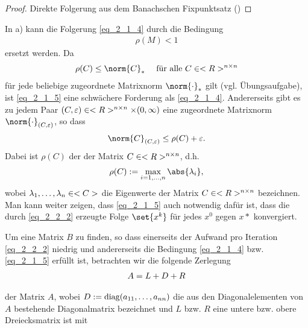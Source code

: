 \begin{proof}
	Direkte Folgerung aus dem Banachschen Fixpunktsatz ()
\end{proof}


\begin{remark}
	In a) kann die Folgerung \eqref{eq_2_1_4} durch die Bedingung
	\begin{align}
	\rho(M) < 1\label{eq_2_1_5}
	\end{align}
	ersetzt werden. Da
	\begin{align}
		\rho(C) \le \norm{C}_{\ast} \quad \text{ für alle } C \in \Rnn \notag
	\end{align}
	für jede beliebige zugeordnete Matrixnorm $\norm{\cdot}_{\ast}$ gilt (vgl. Übungsaufgabe), ist \eqref{eq_2_1_5} eine schwächere Forderung als \eqref{eq_2_1_4}. Andererseits gibt es zu jedem Paar $(C,\varepsilon) \in <R>^{n \times n} \times (0,\infty)$ eine zugeordnete Matrixnorm $\norm{\cdot}_{(C,\epsilon)}$, so dass
	\begin{align}
		\norm{C}_{(C,\epsilon)} \le \rho(C) + \epsilon. \notag
	\end{align}
	Dabei ist $\rho(C)$ der  der Matrix $C \in <R>^{n \times n}$, d.h.
	\begin{align}
		\rho(C) := \max_{i = 1,\dots,n}\abs{\lambda_i}, \notag
	\end{align}
	wobei $\lambda_1,\dots,\lambda_n \in <C>$ die Eigenwerte der Matrix $C \in <R>^{n \times n}$ bezeichnen. Man kann weiter zeigen, dass \eqref{eq_2_1_5} auch notwendig dafür ist, dass die durch \eqref{eq_2_2_2} erzeugte Folge $\set{x^k}$ für jedes $x^0$ gegen $x*$ konvergiert.
\end{remark}

Um eine Matrix $B$ zu finden, so dass einerseits der Aufwand pro Iteration \eqref{eq_2_2_2} niedrig und andererseits die Bedingung \eqref{eq_2_1_4} bzw. \eqref{eq_2_1_5} erfüllt ist, betrachten wir die folgende Zerlegung
\begin{align}
	A = L + D + R \notag
\end{align}

der Matrix $A$, wobei $D:= \operatorname{diag}(a_{11}, \dots, a_{nn})$ die aus den Diagonalelementen von $A$ bestehende Diagonalmatrix bezeichnet und $L$ bzw. $R$ eine untere bzw. obere Dreiecksmatrix ist mit

